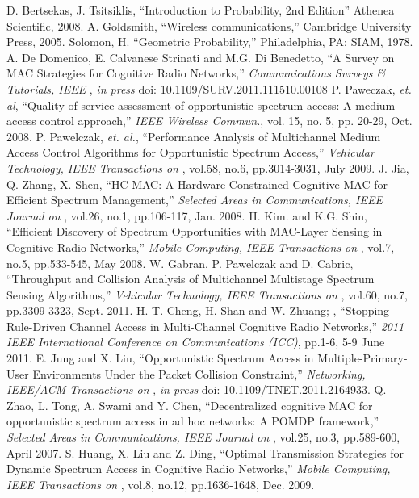 \begin{thebibliography}{}
D. Bertsekas, J. Tsitsiklis, ``Introduction to Probability, 2nd Edition'' Athenea Scientific, 2008. 
A. Goldsmith, ``Wireless communications,'' Cambridge University Press, 2005.
Solomon, H. ``Geometric Probability,'' Philadelphia, PA: SIAM, 1978.
 A. De Domenico, E. Calvanese Strinati and M.G. Di Benedetto, ``A Survey on MAC Strategies for Cognitive Radio Networks,'' \emph{Communications Surveys \& Tutorials, IEEE }, \textit{in press} doi: 10.1109/SURV.2011.111510.00108
 P. Paweczak, \textit{et. al}, ``Quality of service assessment of opportunistic spectrum access: A medium access control approach,'' \emph{IEEE Wireless Commun.}, vol. 15, no. 5, pp. 20-29, Oct. 2008.
 P. Pawelczak, \textit{et. al.}, ``Performance Analysis of Multichannel Medium Access Control Algorithms for Opportunistic Spectrum Access,'' \emph{Vehicular Technology, IEEE Transactions on }, vol.58, no.6, pp.3014-3031, July 2009.
 J. Jia, Q. Zhang, X. Shen, ``HC-MAC: A Hardware-Constrained Cognitive MAC for Efficient Spectrum Management,'' \emph{Selected Areas in Communications, IEEE Journal on }, vol.26, no.1, pp.106-117, Jan. 2008.
 H. Kim. and K.G. Shin, ``Efficient Discovery of Spectrum Opportunities with MAC-Layer Sensing in Cognitive Radio Networks,'' \emph{Mobile Computing, IEEE Transactions on }, vol.7, no.5, pp.533-545, May 2008.
 W. Gabran, P. Pawelczak and D. Cabric, ``Throughput and Collision Analysis of Multichannel Multistage Spectrum Sensing Algorithms,'' \emph{Vehicular Technology, IEEE Transactions on }, vol.60, no.7, pp.3309-3323, Sept. 2011.
 H. T. Cheng, H. Shan and W. Zhuang; , ``Stopping Rule-Driven Channel Access in Multi-Channel Cognitive Radio Networks,'' \emph{2011 IEEE International Conference on Communications (ICC)}, pp.1-6, 5-9 June 2011.
 E. Jung and X. Liu, ``Opportunistic Spectrum Access in Multiple-Primary-User Environments Under the Packet Collision Constraint,'' \emph{Networking, IEEE/ACM Transactions on }, \textit{in press} doi: 10.1109/TNET.2011.2164933.
 Q. Zhao, L. Tong, A. Swami and Y. Chen, ``Decentralized cognitive MAC for opportunistic spectrum access in ad hoc networks: A POMDP framework,'' \emph{Selected Areas in Communications, IEEE Journal on }, vol.25, no.3, pp.589-600, April 2007.
 S. Huang, X. Liu and Z. Ding, ``Optimal Transmission Strategies for Dynamic Spectrum Access in Cognitive Radio Networks,'' \emph{Mobile Computing, IEEE Transactions on }, vol.8, no.12, pp.1636-1648, Dec. 2009.

\end{thebibliography}
